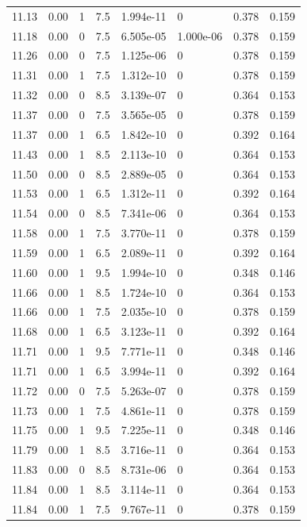 \documentclass[preview]{standalone}
\begin{document}
{{{{{{{{\begin{tabular}{L{1.2cm}C{1.2cm} C{0.3cm}C{0.5cm} C{1.4cm}C{1.4cm} C{1.4cm}C{1.4cm}}
  11.13  &  0.00  & 1     & 7.5 &  1.994e-11  & 0  & 0.378 &  0.159   \\ 
  11.18  &  0.00  & 0     & 7.5 &  6.505e-05  & 1.000e-06  & 0.378 &  0.159   \\ 
  11.26  &  0.00  & 0     & 7.5 &  1.125e-06  & 0  & 0.378 &  0.159   \\ 
  11.31  &  0.00  & 1     & 7.5 &  1.312e-10  & 0  & 0.378 &  0.159   \\ 
  11.32  &  0.00  & 0     & 8.5 &  3.139e-07  & 0  & 0.364 &  0.153   \\ 
  11.37  &  0.00  & 0     & 7.5 &  3.565e-05  & 0  & 0.378 &  0.159   \\ 
  11.37  &  0.00  & 1     & 6.5 &  1.842e-10  & 0  & 0.392 &  0.164   \\ 
  11.43  &  0.00  & 1     & 8.5 &  2.113e-10  & 0  & 0.364 &  0.153   \\ 
  11.50  &  0.00  & 0     & 8.5 &  2.889e-05  & 0  & 0.364 &  0.153   \\ 
  11.53  &  0.00  & 1     & 6.5 &  1.312e-11  & 0  & 0.392 &  0.164   \\ 
  11.54  &  0.00  & 0     & 8.5 &  7.341e-06  & 0  & 0.364 &  0.153   \\ 
  11.58  &  0.00  & 1     & 7.5 &  3.770e-11  & 0  & 0.378 &  0.159   \\ 
  11.59  &  0.00  & 1     & 6.5 &  2.089e-11  & 0  & 0.392 &  0.164   \\ 
  11.60  &  0.00  & 1     & 9.5 &  1.994e-10  & 0  & 0.348 &  0.146   \\ 
  11.66  &  0.00  & 1     & 8.5 &  1.724e-10  & 0  & 0.364 &  0.153   \\ 
  11.66  &  0.00  & 1     & 7.5 &  2.035e-10  & 0  & 0.378 &  0.159   \\ 
  11.68  &  0.00  & 1     & 6.5 &  3.123e-11  & 0  & 0.392 &  0.164   \\ 
  11.71  &  0.00  & 1     & 9.5 &  7.771e-11  & 0  & 0.348 &  0.146   \\ 
  11.71  &  0.00  & 1     & 6.5 &  3.994e-11  & 0  & 0.392 &  0.164   \\ 
  11.72  &  0.00  & 0     & 7.5 &  5.263e-07  & 0  & 0.378 &  0.159   \\ 
  11.73  &  0.00  & 1     & 7.5 &  4.861e-11  & 0  & 0.378 &  0.159   \\ 
  11.75  &  0.00  & 1     & 9.5 &  7.225e-11  & 0  & 0.348 &  0.146   \\ 
  11.79  &  0.00  & 1     & 8.5 &  3.716e-11  & 0  & 0.364 &  0.153   \\ 
  11.83  &  0.00  & 0     & 8.5 &  8.731e-06  & 0  & 0.364 &  0.153   \\ 
  11.84  &  0.00  & 1     & 8.5 &  3.114e-11  & 0  & 0.364 &  0.153   \\ 
  11.84  &  0.00  & 1     & 7.5 &  9.767e-11  & 0  & 0.378 &  0.159   \\ 
\hline 
\end{tabular} 

}}}}}}}}
\end{document}
